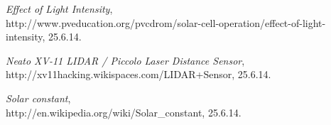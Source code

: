 \documentclass[a4paper,12pt]{article}
\begin{document}
\begin{thebibliography}{14}
	{\em Effect of Light Intensity}, \\
	http://www.pveducation.org/pvcdrom/solar-cell-operation/effect-of-light-intensity, 25.6.14.

	{\em Neato XV-11 LIDAR / Piccolo Laser Distance Sensor}, \\
	http://xv11hacking.wikispaces.com/LIDAR+Sensor, 25.6.14.

	{\em Solar constant}, \\
	http://en.wikipedia.org/wiki/Solar\_constant, 25.6.14.

\end{thebibliography}
\end{document}
